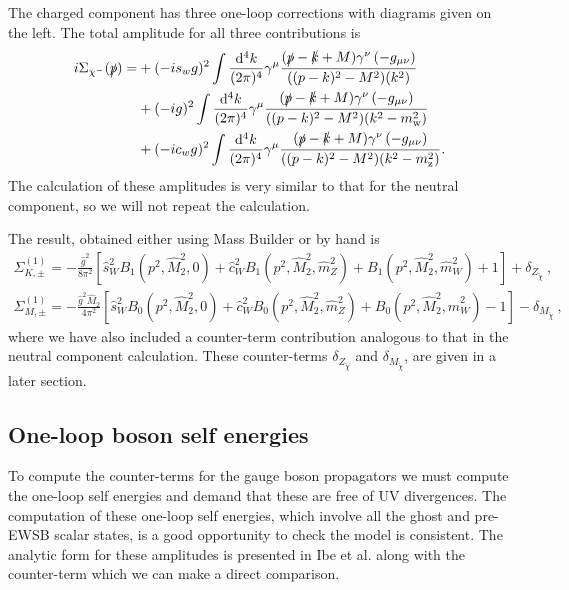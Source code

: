 \documentclass[11pt]{article}
\def\cm{\chi^-}
\renewcommand{\d}{\ensuremath{\operatorname{d}\!}}
\newcommand{\mb}{\textsf{Mass Builder} \! }
\begin{document}
\noindent\begin{minipage}{0.7\textwidth}

The charged component has three one-loop corrections with diagrams given on the left.  The total amplitude for all three contributions is
\begin{align}
\begin{split}
i\Sigma_{\cm}(\slashed{p})=
&+(-is_wg)^2 \int \frac{\d^4k}{(2\pi)^4} \gamma^{\mu}\frac{(\slashed{p}-\slashed{k}+M)\gamma^{\nu}\left(-g_{\mu\nu}\right)}{((p-k)^2-M^2)(k^2)}\\
&+(-ig)^2 \int \frac{\d^4k}{(2\pi)^4} \gamma^{\mu}\frac{(\slashed{p}-\slashed{k}+M)\gamma^{\nu}\left(-g_{\mu\nu}\right)}{((p-k)^2-M^2)(k^2-m_{\text{w}}^2)}\\
&+(-ic_wg)^2 \int \frac{\d^4k}{(2\pi)^4} \gamma^{\mu}\frac{(\slashed{p}-\slashed{k}+M)\gamma^{\nu}\left(-g_{\mu\nu}\right)}{((p-k)^2-M^2)(k^2-m_{\text{z}}^2)}.
\end{split}
\end{align}
The calculation of these amplitudes is very similar to that for the neutral component, so we will not repeat the calculation. 

\end{minipage}
The result, obtained either using \mb or by hand is
{
\begin{eqnarray}
\Sigma_{K, \pm}^{(1)} =
-\frac{\hat{g}^2}{8\pi^2}
\left[ \hat{s}_W^2 B_1(p^2,\hat{M}_2^2,0)
+\hat{c}_W^2 B_1(p^2,\hat{M}_2^2, \hat m_Z^2)
+B_1(p^2, \hat{M}_2^2, \hat{m}_W^2) + 1  \right]
+ \delta_{Z_{\tilde{\chi}}}\ , \label{eq: Cha_K} \\
\Sigma_{M, \pm}^{(1)} =
-\frac{\hat{g}^2 \hat{M}_2}{4\pi^2}
\left[ \hat{s}_W^2 B_0(p^2, \hat{M}_2^2,0)
+\hat{c}_W^2 B_0(p^2, \hat{M}_2^2, \hat{m}_Z^2)
+B_0(p^2, \hat{M}_2^2, \hat{m}_W^2) - 1 \right]
-\delta_{M_{\tilde{\chi}}}\ ,
 \label{eq: Cha_M}
\end{eqnarray}
}
where we have also included a counter-term contribution analogous to that in the neutral component calculation.  These counter-terms $\delta_{Z_{\tilde{\chi}}}$ and $\delta_{M_{\tilde{\chi}}}$, are given in a later section.


\subsection{One-loop boson self energies}

To compute the counter-terms for the gauge boson propagators we must compute the one-loop self energies and demand that these are free of UV divergences.  The computation of these one-loop self energies, which involve all the ghost and pre-EWSB scalar states, is a good opportunity to check the model is consistent.  The analytic form for these amplitudes is presented in Ibe et al. along with the counter-term which we can make a direct comparison.\\
\end{document}
